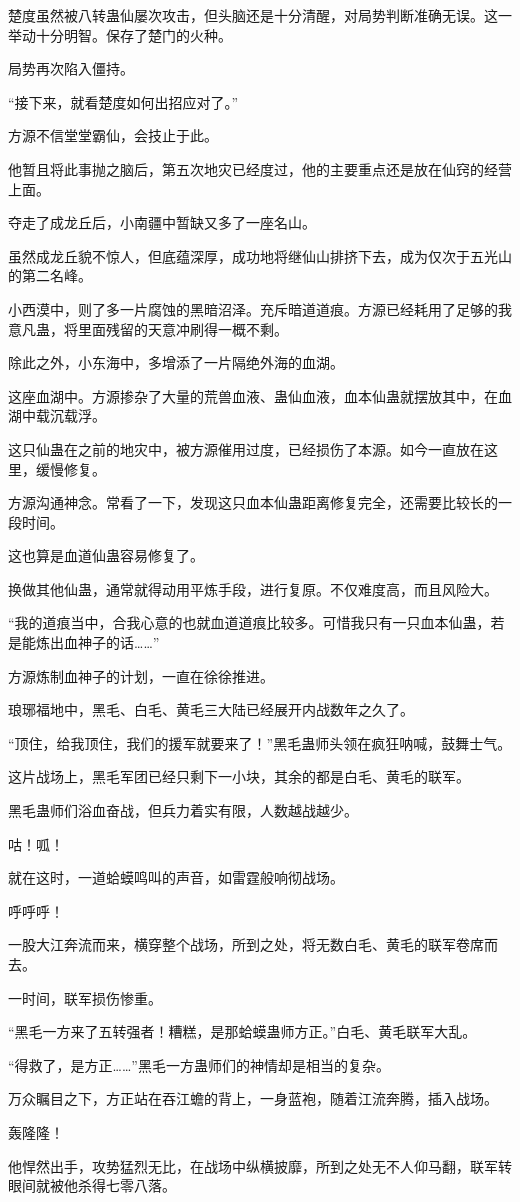 \begin{this_body}
楚度虽然被八转蛊仙屡次攻击，但头脑还是十分清醒，对局势判断准确无误。这一举动十分明智。保存了楚门的火种。

局势再次陷入僵持。

“接下来，就看楚度如何出招应对了。”

方源不信堂堂霸仙，会技止于此。

他暂且将此事抛之脑后，第五次地灾已经度过，他的主要重点还是放在仙窍的经营上面。

夺走了成龙丘后，小南疆中暂缺又多了一座名山。

虽然成龙丘貌不惊人，但底蕴深厚，成功地将继仙山排挤下去，成为仅次于五光山的第二名峰。

小西漠中，则了多一片腐蚀的黑暗沼泽。充斥暗道道痕。方源已经耗用了足够的我意凡蛊，将里面残留的天意冲刷得一概不剩。

除此之外，小东海中，多增添了一片隔绝外海的血湖。

这座血湖中。方源掺杂了大量的荒兽血液、蛊仙血液，血本仙蛊就摆放其中，在血湖中载沉载浮。

这只仙蛊在之前的地灾中，被方源催用过度，已经损伤了本源。如今一直放在这里，缓慢修复。

方源沟通神念。常看了一下，发现这只血本仙蛊距离修复完全，还需要比较长的一段时间。

这也算是血道仙蛊容易修复了。

换做其他仙蛊，通常就得动用平炼手段，进行复原。不仅难度高，而且风险大。

“我的道痕当中，合我心意的也就血道道痕比较多。可惜我只有一只血本仙蛊，若是能炼出血神子的话……”

方源炼制血神子的计划，一直在徐徐推进。

琅琊福地中，黑毛、白毛、黄毛三大陆已经展开内战数年之久了。

“顶住，给我顶住，我们的援军就要来了！”黑毛蛊师头领在疯狂呐喊，鼓舞士气。

这片战场上，黑毛军团已经只剩下一小块，其余的都是白毛、黄毛的联军。

黑毛蛊师们浴血奋战，但兵力着实有限，人数越战越少。

咕！呱！

就在这时，一道蛤蟆鸣叫的声音，如雷霆般响彻战场。

呼呼呼！

一股大江奔流而来，横穿整个战场，所到之处，将无数白毛、黄毛的联军卷席而去。

一时间，联军损伤惨重。

“黑毛一方来了五转强者！糟糕，是那蛤蟆蛊师方正。”白毛、黄毛联军大乱。

“得救了，是方正……”黑毛一方蛊师们的神情却是相当的复杂。

万众瞩目之下，方正站在吞江蟾的背上，一身蓝袍，随着江流奔腾，插入战场。

轰隆隆！

他悍然出手，攻势猛烈无比，在战场中纵横披靡，所到之处无不人仰马翻，联军转眼间就被他杀得七零八落。

\end{this_body}

